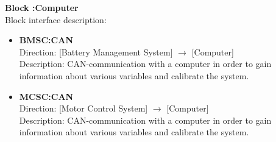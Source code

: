 \textbf{Block :Computer}\\
Block interface description:
\begin{itemize}
	\item \textbf{BMSC:CAN}\\
	Direction: [Battery Management System] $\rightarrow$ [Computer]\\
	Description: CAN-communication with a computer in order to gain information about various variables and calibrate the system.
	\item \textbf{MCSC:CAN}\\
	Direction: [Motor Control System] $\rightarrow$ [Computer]\\
	Description: CAN-communication with a computer in order to gain information about various variables and calibrate the system.
\end{itemize}